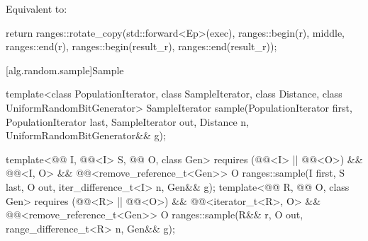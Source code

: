 \begin{itemdescr}
\pnum
\effects
Equivalent to:
\begin{codeblock}
return ranges::rotate_copy(std::forward<Ep>(exec), ranges::begin(r), middle, ranges::end(r),
                           ranges::begin(result_r), ranges::end(result_r));
\end{codeblock}
\end{itemdescr}

[alg.random.sample]{Sample}

%
\begin{itemdecl}
template<class PopulationIterator, class SampleIterator,
         class Distance, class UniformRandomBitGenerator>
  SampleIterator sample(PopulationIterator first, PopulationIterator last,
                        SampleIterator out, Distance n,
                        UniformRandomBitGenerator&& g);

template<@@ I, @@<I> S, @@ O, class Gen>
  requires (@@<I> || @@<O>) &&
           @@<I, O> &&
           @@<remove_reference_t<Gen>>
  O ranges::sample(I first, S last, O out, iter_difference_t<I> n, Gen&& g);
template<@@ R, @@ O, class Gen>
  requires (@@<R> || @@<O>) &&
           @@<iterator_t<R>, O> &&
           @@<remove_reference_t<Gen>>
  O ranges::sample(R&& r, O out, range_difference_t<R> n, Gen&& g);
\end{itemdecl}

